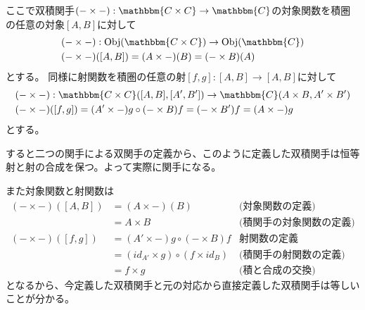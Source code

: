 \documentclass[dvipdfmx]{jsarticle}
\newcommand{\cat}[1]{\mathbbm{#1}}
\newcommand{\arrow}{\rightarrow}
\newcommand{\functor}[3]{#1:\cat{#2}\arrow \cat{#3}}
\newcommand{\obj}[1]{\mathrm{Obj}(\cat{#1})}
\newcommand{\mor}[3]{#1:#2\arrow #3}
\newcommand{\arset}[3]{\cat{#1}(#2,#3)}
\newcommand{\pcobj}[1]{[#1]}
\numberwithin{proof}{subsection}
\numberwithin{prop}{subsection}
\numberwithin{define}{subsection}
\begin{document}
	ここで双積関手$\functor{(-\times -)}{C\times C}{C}$の対象関数を積圏の任意の対象$\pcobj{A,B}$に対して
	\begin{align*}
		\mor{&(-\times -)}{\obj{C\times C}}{\obj{C}}\\
		&(-\times -)(\pcobj{A,B})=(A\times -)(B)=(-\times B)(A)
	\end{align*}
	とする。
	同様に射関数を積圏の任意の射$\mor{\pcobj{f,g}}{\pcobj{A,B}}{\pcobj{A,B}}$に対して
	\begin{align*}
		\mor{&(-\times -)}{\arset{C\times C}{\pcobj{A,B}}{\pcobj{A',B'}}}{\arset{C}{A\times B}{A'\times B'}}\\
		&(-\times -)(\pcobj{f,g})=(A'\times -)g\circ (-\times B)f=(-\times B')f=(A\times -)g
	\end{align*}
	とする。

	すると二つの関手による双関手の定義から、このように定義した双積関手は恒等射と射の合成を保つ。よって実際に関手になる。

	また対象関数と射関数は
	\begin{align*}
		(-\times -)(\pcobj{A,B})&=(A\times -)(B)&\text{(対象関数の定義)}\\
		&=A\times B&\text{(積関手の対象関数の定義)}\\
		(-\times -)(\pcobj{f,g})&=(A'\times -)g\circ (-\times B)f&\text{射関数の定義}\\
		&=(id_{A'}\times g)\circ(f\times id_B)&\text{(積関手の射関数の定義)}\\
		&=f\times g&\text{(積と合成の交換)}
	\end{align*}
	となるから、今定義した双積関手と元の対応から直接定義した双積関手は等しいことが分かる。
\end{document}
